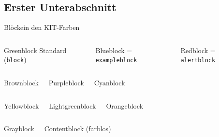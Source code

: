 \documentclass{sdqbeamer}
\begin{document}
\subsection{Erster Unterabschnitt}
\begin{frame}{Blöcke}{in den KIT-Farben}
  \begin{columns}
    \begin{greenblock}{Greenblock}
      Standard (\texttt{block})
        \end{greenblock}
    \begin{blueblock}{Blueblock}
      = \texttt{exampleblock}
        \end{blueblock}
    \begin{redblock}{Redblock}
      = \texttt{alertblock}
        \end{redblock}
  \end{columns}
  \begin{columns}
        \begin{brownblock}{Brownblock}
        \end{brownblock}
        \begin{purpleblock}{Purpleblock}
        \end{purpleblock}
        \begin{cyanblock}{Cyanblock}
        \end{cyanblock}
  \end{columns}
  \begin{columns}
        \begin{yellowblock}{Yellowblock}
        \end{yellowblock}
        \begin{lightgreenblock}{Lightgreenblock}
        \end{lightgreenblock}
        \begin{orangeblock}{Orangeblock}
        \end{orangeblock}
  \end{columns}
  \begin{columns}
        \begin{grayblock}{Grayblock}
        \end{grayblock}
    \begin{contentblock}{Contentblock}
      (farblos)
    \end{contentblock}
  \end{columns}
\end{frame}
    
\end{document}
